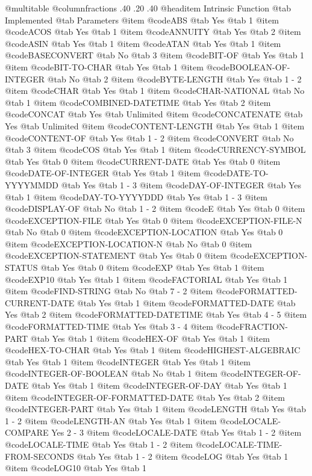 @multitable @columnfractions .40 .20 .40
@headitem Intrinsic Function @tab Implemented @tab	Parameters
@item @code{ABS} @tab Yes @tab 1
@item @code{ACOS} @tab Yes @tab 1
@item @code{ANNUITY} @tab Yes @tab 2
@item @code{ASIN} @tab Yes @tab 1
@item @code{ATAN} @tab Yes @tab 1
@item @code{BASECONVERT} @tab No @tab 3
@item @code{BIT-OF} @tab Yes @tab 1
@item @code{BIT-TO-CHAR} @tab Yes @tab 1
@item @code{BOOLEAN-OF-INTEGER} @tab No @tab 2
@item @code{BYTE-LENGTH} @tab Yes @tab 1 - 2
@item @code{CHAR} @tab Yes @tab 1
@item @code{CHAR-NATIONAL} @tab No @tab 1
@item @code{COMBINED-DATETIME} @tab Yes @tab 2
@item @code{CONCAT} @tab Yes @tab Unlimited
@item @code{CONCATENATE} @tab Yes @tab Unlimited
@item @code{CONTENT-LENGTH} @tab Yes @tab 1
@item @code{CONTENT-OF} @tab Yes @tab 1 - 2
@item @code{CONVERT} @tab No @tab 3
@item @code{COS} @tab Yes @tab 1
@item @code{CURRENCY-SYMBOL} @tab Yes @tab 0
@item @code{CURRENT-DATE} @tab Yes @tab 0
@item @code{DATE-OF-INTEGER} @tab Yes @tab 1
@item @code{DATE-TO-YYYYMMDD} @tab Yes @tab 1 - 3
@item @code{DAY-OF-INTEGER} @tab Yes @tab 1
@item @code{DAY-TO-YYYYDDD} @tab Yes @tab 1 - 3
@item @code{DISPLAY-OF} @tab No @tab 1 - 2
@item @code{E} @tab Yes @tab 0
@item @code{EXCEPTION-FILE} @tab Yes @tab 0
@item @code{EXCEPTION-FILE-N} @tab No @tab 0
@item @code{EXCEPTION-LOCATION} @tab Yes @tab 0
@item @code{EXCEPTION-LOCATION-N} @tab No @tab 0
@item @code{EXCEPTION-STATEMENT} @tab Yes @tab 0
@item @code{EXCEPTION-STATUS} @tab Yes @tab 0
@item @code{EXP} @tab Yes @tab 1
@item @code{EXP10} @tab Yes @tab 1
@item @code{FACTORIAL} @tab Yes @tab 1
@item @code{FIND-STRING} @tab No @tab 7 - 2
@item @code{FORMATTED-CURRENT-DATE} @tab Yes @tab 1
@item @code{FORMATTED-DATE} @tab Yes @tab 2
@item @code{FORMATTED-DATETIME} @tab Yes @tab 4 - 5
@item @code{FORMATTED-TIME} @tab Yes @tab 3 - 4
@item @code{FRACTION-PART} @tab Yes @tab 1
@item @code{HEX-OF} @tab Yes @tab 1
@item @code{HEX-TO-CHAR} @tab Yes @tab 1
@item @code{HIGHEST-ALGEBRAIC} @tab Yes @tab 1
@item @code{INTEGER} @tab Yes @tab 1
@item @code{INTEGER-OF-BOOLEAN} @tab No @tab 1
@item @code{INTEGER-OF-DATE} @tab Yes @tab 1
@item @code{INTEGER-OF-DAY} @tab Yes @tab 1
@item @code{INTEGER-OF-FORMATTED-DATE} @tab Yes @tab 2
@item @code{INTEGER-PART} @tab Yes @tab 1
@item @code{LENGTH} @tab Yes @tab 1 - 2
@item @code{LENGTH-AN} @tab Yes @tab 1
@item @code{LOCALE-COMPARE	Yes	2 - 3}
@item @code{LOCALE-DATE} @tab Yes @tab 1 - 2
@item @code{LOCALE-TIME} @tab Yes @tab 1 - 2
@item @code{LOCALE-TIME-FROM-SECONDS} @tab Yes @tab 1 - 2
@item @code{LOG} @tab Yes @tab 1
@item @code{LOG10} @tab Yes @tab 1
